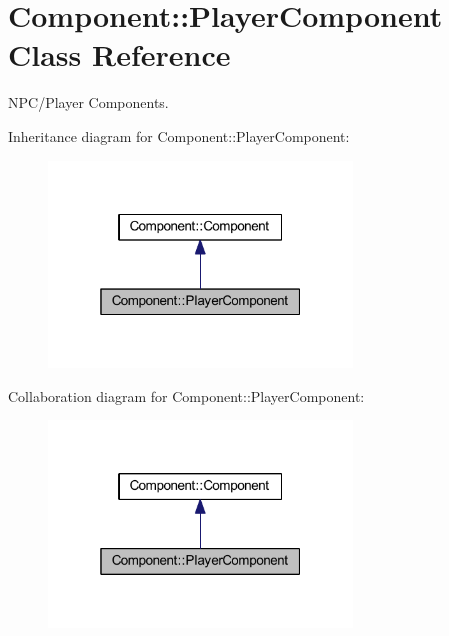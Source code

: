 \hypertarget{class_component_1_1_player_component}{}\section{Component\+:\+:Player\+Component Class Reference}
\label{class_component_1_1_player_component}


N\+P\+C/\+Player Components.  




Inheritance diagram for Component\+:\+:Player\+Component\+:
\nopagebreak
\begin{figure}[H]
\begin{center}
\leavevmode
\includegraphics[width=229pt]{class_component_1_1_player_component__inherit__graph}
\end{center}
\end{figure}


Collaboration diagram for Component\+:\+:Player\+Component\+:
\nopagebreak
\begin{figure}[H]
\begin{center}
\leavevmode
\includegraphics[width=229pt]{class_component_1_1_player_component__coll__graph}
\end{center}
\end{figure}
